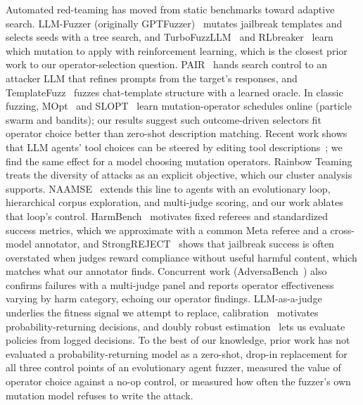 \documentclass{article}
\begin{document}
Automated red-teaming has moved from static benchmarks toward adaptive search.
LLM-Fuzzer (originally GPTFuzzer)~\citep{yu2024llmfuzzer} mutates jailbreak templates and selects seeds with a tree search, and TurboFuzzLLM~\citep{goel2025turbofuzzllm} and RLbreaker~\citep{chen2024rlbreaker} learn which mutation to apply with reinforcement learning, which is the closest prior work to our operator-selection question.
PAIR~\citep{chao2025pair} hands search control to an attacker LLM that refines prompts from the target's responses, and TemplateFuzz~\citep{shen2026templatefuzz} fuzzes chat-template structure with a learned oracle.
In classic fuzzing, MOpt~\citep{lyu2019mopt} and SLOPT~\citep{koike2022slopt} learn mutation-operator schedules online (particle swarm and bandits); our results suggest such outcome-driven selectors fit operator choice better than zero-shot description matching.
Recent work shows that LLM agents' tool choices can be steered by editing tool descriptions~\citep{faghih2025toolprefs,sneh2025tooltweak,blankenstein2026biasbusters}; we find the same effect for a model choosing mutation operators.
Rainbow Teaming~\citep{samvelyan2024rainbow} treats the diversity of attacks as an explicit objective, which our cluster analysis supports.
NAAMSE~\citep{pai2026naamse} extends this line to agents with an evolutionary loop, hierarchical corpus exploration, and multi-judge scoring, and our work ablates that loop's control.
HarmBench~\citep{mazeika2024harmbench} motivates fixed referees and standardized success metrics, which we approximate with a common Meta referee and a cross-model annotator, and StrongREJECT~\citep{souly2024strongreject} shows that jailbreak success is often overstated when judges reward compliance without useful harmful content, which matches what our annotator finds.
Concurrent work (AdversaBench~\citep{khandelwal2026adversabench}) also confirms failures with a multi-judge panel and reports operator effectiveness varying by harm category, echoing our operator findings.
LLM-as-a-judge~\citep{zheng2023judging} underlies the fitness signal we attempt to replace, calibration~\citep{guo2017calibration} motivates probability-returning decisions, and doubly robust estimation~\citep{dudik2011doubly} lets us evaluate policies from logged decisions.
To the best of our knowledge, prior work has not evaluated a probability-returning model as a zero-shot, drop-in replacement for all three control points of an evolutionary agent fuzzer, measured the value of operator choice against a no-op control, or measured how often the fuzzer's own mutation model refuses to write the attack.
\end{document}
